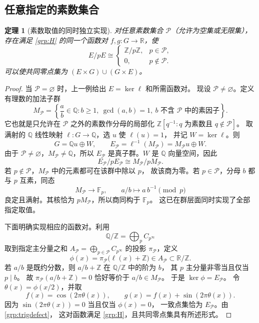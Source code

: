 \documentclass[11pt,a4paper,oneside,openany]{book}
\theoremstyle{lecture}
\newtheorem{theorem}{定理}[section]
\newcommand{\Q}{\mathbb Q}
\newcommand{\R}{\mathbb R}
\newcommand{\Z}{\mathbb Z}
\newcommand{\Fp}{\mathbb F_p}
\newcommand{\Circle}{\mathbb R/\mathbb Z}
\numberwithin{equation}{section}
\begin{document}
\subsection{任意指定的素数集合}
\begin{theorem}[素数取值的同时独立实现]\label{grp:independencetheorem}
对任意素数集合 $\mathcal P$（允许为空集或无限集），存在满足
\eqref{grp:H} 的同一个函数对 $f,g:G\to\R$，使
\begin{equation}\label{grp:independent}
 E/pE\cong
 \begin{cases}
 \Z/p\Z,&p\in\mathcal P,\\
 0,&p\notin\mathcal P.
 \end{cases}
\end{equation}
可以使共同零点集为 $(E\times G)\cup(G\times E)$。
\end{theorem}

\begin{proof}
当 $\mathcal P=\varnothing$ 时，上一例给出 $E=\ker\ell$ 和所需函数对。
现设 $\mathcal P\ne\varnothing$。定义有理数的加法子群
\[
 M_{\mathcal P}
 =\left\{\frac ab\in\Q:
   b\ge1,\ \gcd(a,b)=1,\
   b\text{ 不含 }\mathcal P\text{ 中的素因子}\right\}.
\]
它也就是只允许在 $\mathcal P$ 之外的素数作分母的局部化
$\Z[q^{-1}:q\text{ 为素数且 }q\notin\mathcal P]$。
取满射的 $\Q$ 线性映射 $\ell:G\to\Q$，选 $u$ 使 $\ell(u)=1$，
并记 $W=\ker\ell$。则
\begin{equation}\label{grp:localizedE}
 G=\Q u\oplus W,\qquad
 E_{\mathcal P}=\ell^{-1}(M_{\mathcal P})
              =M_{\mathcal P}u\oplus W.
\end{equation}
由于 $\mathcal P\ne\varnothing$，$M_{\mathcal P}\ne\Q$，所以
$E_{\mathcal P}$ 是真子群。$W$ 是 $\Q$ 向量空间，因此
\[
 E_{\mathcal P}/pE_{\mathcal P}
 \cong M_{\mathcal P}/pM_{\mathcal P}.
\]
若 $p\notin\mathcal P$，$M_{\mathcal P}$ 中的元素都可在该群中除以 $p$，
故该商为零。若 $p\in\mathcal P$，分母 $b$ 都与 $p$ 互素，同态
\[
 M_{\mathcal P}\longrightarrow\Fp,\qquad
 a/b\longmapsto a\,b^{-1}\pmod p
\]
良定且满射。其核恰为 $pM_{\mathcal P}$，所以商同构于 $\Fp$。
这已在群层面同时实现了全部指定取值。

下面明确实现相应的函数对。利用
\[
 \Q/\Z=\bigoplus_p C_{p^\infty}
\]
取到指定主分量之和 $A_{\mathcal P}=\bigoplus_{p\in\mathcal P}C_{p^\infty}$
的投影 $\pi_{\mathcal P}$，定义
\[
 \phi(x)=\pi_{\mathcal P}\bigl(\ell(x)+\Z\bigr)
 \in A_{\mathcal P}\subset\Circle.
\]
若 $a/b$ 是既约分数，则 $a/b+\Z$ 在 $\Q/\Z$ 中的阶为 $b$，
其 $p$ 主分量非零当且仅当 $p\mid b$。
故 $\pi_{\mathcal P}(a/b+\Z)=0$ 恰好等价于 $a/b\in M_{\mathcal P}$。
于是 $\ker\phi=E_{\mathcal P}$。
令 $\theta(x)=\phi(x/2)$，并取
\[
 f(x)=\cos(2\pi\theta(x)),\qquad
 g(x)=f(x)+\sin(2\pi\theta(x)).
\]
因为 $\sin(2\pi\theta(x))=0$ 当且仅当 $\phi(x)=0$，
一致点集恰为 $E_{\mathcal P}$。由 \eqref{grp:trigdefect}，
这对函数满足 \eqref{grp:H}，且共同零点集具有所述形式。
\end{proof}
\end{document}
